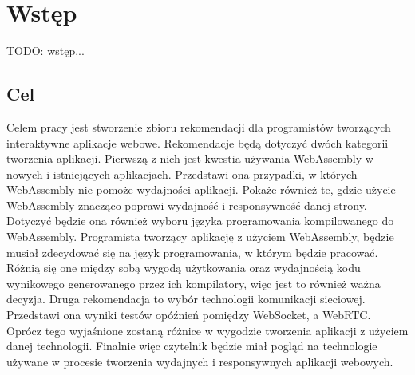 \documentclass[language=polish,type=master]{aghmodern}
\author{Piotr Szczygieł}
\date{2022}
\begin{document}
\frontmatter
\maketitle

\setcounter{tocdepth}{1}
\tableofcontents

\mainmatter

\onehalfspacing

\chapter{Wstęp}
TODO: wstęp...

\section{Cel}
Celem pracy jest stworzenie zbioru rekomendacji dla programistów tworzących interaktywne aplikacje webowe.
Rekomendacje będą dotyczyć dwóch kategorii tworzenia aplikacji.
Pierwszą z nich jest kwestia używania WebAssembly w nowych i istniejących aplikacjach.
Przedstawi ona przypadki, w których WebAssembly nie pomoże wydajności aplikacji.
Pokaże również te, gdzie użycie WebAssembly znacząco poprawi wydajność i responsywność danej strony.
Dotyczyć będzie ona również wyboru języka programowania kompilowanego do WebAssembly.
Programista tworzący aplikację z użyciem WebAssembly, będzie musiał zdecydować się na język programowania, w którym będzie pracować.
Różnią się one między sobą wygodą użytkowania oraz wydajnością kodu wynikowego generowanego przez ich kompilatory, więc jest to również ważna decyzja.
Druga rekomendacja to wybór technologii komunikacji sieciowej.
Przedstawi ona wyniki testów opóźnień pomiędzy WebSocket, a WebRTC.
Oprócz tego wyjaśnione zostaną różnice w wygodzie tworzenia aplikacji z użyciem danej technologii.
Finalnie więc czytelnik będzie miał pogląd na technologie używane w procesie tworzenia wydajnych i responsywnych aplikacji webowych.
\end{document}
